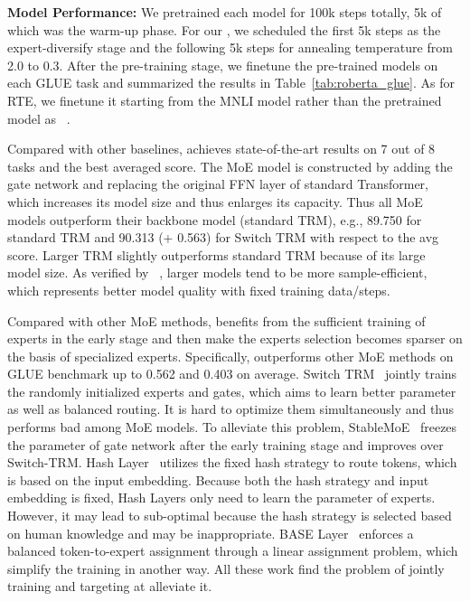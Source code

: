 \textbf{Model Performance:}
We pretrained each model for 100k steps totally, 5k of which was the warm-up phase. For our \ourmethods{}, we scheduled the first 5k steps as the expert-diversify stage and the following 5k steps for annealing temperature from 2.0 to 0.3. After the pre-training stage, we finetune the pre-trained models on each GLUE task and summarized the results in Table~\ref{tab:roberta_glue}. As for RTE, we finetune it starting from the MNLI model rather than the pretrained model as ~\citet{liu2019roberta}. 

Compared with other baselines, \ourmethods{} achieves state-of-the-art results on 7 out of 8 tasks and the best averaged score. The MoE model is constructed by adding the gate network and replacing the original FFN layer of standard Transformer, which increases its model size and thus enlarges its capacity. Thus all MoE models outperform their backbone model (standard TRM), e.g., 89.750 for standard TRM and 90.313 (+ 0.563) for Switch TRM with respect to the avg score. Larger TRM slightly outperforms standard TRM because of its large model size. As verified by ~\citet{DBLP:scaling_laws}, larger models tend to be more sample-efficient, which represents better model quality with fixed training data/steps.

Compared with other MoE methods, \ourmethods{} benefits from the sufficient training of experts in the early stage and then make the experts selection becomes sparser on the basis of specialized experts. 
Specifically, \ourmethods{} outperforms other MoE methods on GLUE benchmark up to 0.562 and 0.403 on average. 
Switch TRM~\cite{DBLP:switch} jointly trains the randomly initialized experts and gates, which aims to learn better parameter as well as balanced routing. It is hard to optimize them simultaneously and thus performs bad among MoE models. To alleviate this problem, StableMoE~\cite{DBLP:conf/acl/stablemoe} freezes the parameter of gate network after the early training stage and improves over Switch-TRM. Hash Layer~\cite{roller2021hash} utilizes the fixed hash strategy to route tokens, which is based on the input embedding. Because both the hash strategy and input embedding is fixed, Hash Layers only need to learn the parameter of experts. However, it may lead to sub-optimal because the hash strategy is selected based on human knowledge and may be inappropriate. BASE Layer~\cite{DBLP:conf/icml/baselayer} enforces a balanced token-to-expert assignment through a linear assignment problem, which simplify the training in another way. All these work find the problem of jointly training and targeting at alleviate it.

